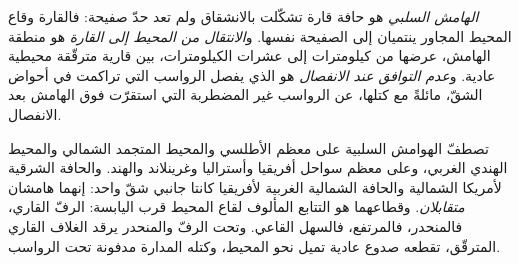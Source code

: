 \begin{definition}\label{def:b1:rifts-ridges-margins:passive-margin}
\emph{الهامش السلبي} هو حافة قارة تشكّلت بالانشقاق ولم تعد حدّ صفيحة: فالقارة وقاع المحيط المجاور ينتميان إلى الصفيحة نفسها. و\emph{الانتقال من المحيط إلى القارة} هو منطقة الهامش، عرضها من كيلومترات إلى عشرات الكيلومترات، بين  قارية مترقّقة  محيطية عادية. و\emph{عدم التوافق عند الانفصال} هو  الذي يفصل الرواسب التي تراكمت في أحواض الشقّ، مائلةً مع كتلها، عن الرواسب غير المضطربة التي استقرّت فوق الهامش بعد الانفصال.
\end{definition}

تصطفّ الهوامش السلبية على معظم الأطلسي والمحيط المتجمد الشمالي والمحيط الهندي الغربي، وعلى معظم سواحل أفريقيا وأستراليا وغرينلاند والهند. والحافة الشرقية لأمريكا الشمالية والحافة الشمالية الغربية لأفريقيا كانتا جانبي شقّ واحد: إنهما هامشان \emph{متقابلان}. وقطاعهما هو التتابع المألوف لقاع المحيط قرب اليابسة: الرفّ القاري، فالمنحدر، فالمرتفع، فالسهل القاعي. وتحت الرفّ والمنحدر يرقد الغلاف القاري المترقّق، تقطعه صدوع عادية تميل نحو المحيط، وكتله المدارة مدفونة تحت الرواسب.


